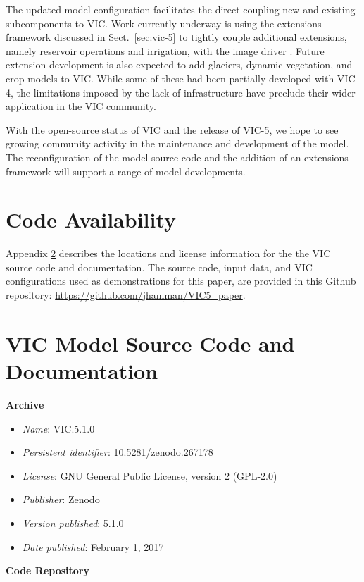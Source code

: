 \documentclass[gmd, manuscript]{copernicus}
\begin{document}
  The updated model configuration facilitates the direct coupling new and existing subcomponents to VIC. Work currently underway is using the extensions framework discussed in Sect.~\ref{sec:vic-5} to tightly couple additional extensions, namely reservoir operations and irrigation, with the image driver \citep{Hamman_2017a}. Future extension development is also expected to add glaciers, dynamic vegetation, and crop models to VIC. While some of these had been partially developed with VIC-4, the limitations imposed by the lack of infrastructure have preclude their wider application in the VIC community.

  With the open-source status of VIC and the release of VIC-5, we hope to see growing community activity in the maintenance and development of the model. The reconfiguration of the model source code and the addition of an extensions framework will support a range of model developments.

\section{Code Availability}
\label{appendix:code_avail}

  Appendix \ref{appendix:source_code} describes the locations and license information for the the VIC source code and documentation. The source code, input data, and VIC configurations used as demonstrations for this paper, are provided in this Github repository: \url{https://github.com/jhamman/VIC5_paper}.

\appendix
\section{VIC Model Source Code and Documentation}
\label{appendix:source_code}
{\bf Archive}

\begin{itemize}
	\item \textit{Name}: VIC.5.1.0
	\item \textit{Persistent identifier}: 10.5281/zenodo.267178
	\item \textit{License}: GNU General Public License, version 2 (GPL-2.0)
	\item \textit{Publisher}:  Zenodo
	\item \textit{Version published}: 5.1.0
	\item \textit{Date published}: February 1, 2017
\end{itemize}

{\bf Code Repository}
\end{document}
